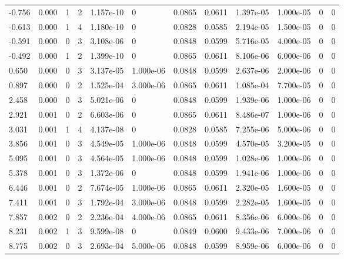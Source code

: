 \documentclass[preview]{standalone}
\begin{document}
{{\begin{tabular}{L{1.2cm}C{1.2cm} C{0.3cm}C{0.5cm} C{1.4cm}C{1.4cm} C{1.4cm}C{1.4cm} C{1.6cm}C{1.6cm} C{1.6cm}C{1.6cm}}
  -0.756  &  0.000  & 1     &  2 &  1.157e-10  & 0  &  0.0865&   0.0611& 1.397e-05 & 1.000e-05   &  0 & 0  \\ 
  -0.613  &  0.000  & 1     &  4 &  1.180e-10  & 0  &  0.0828&   0.0585& 2.194e-05 & 1.500e-05   &  0 & 0  \\ 
  -0.591  &  0.000  & 0     &  3 &  3.108e-06  & 0  &  0.0848&   0.0599& 5.716e-05 & 4.000e-05   &  0 & 0  \\ 
  -0.492  &  0.000  & 1     &  2 &  1.399e-10  & 0  &  0.0865&   0.0611& 8.106e-06 & 6.000e-06   &  0 & 0  \\ 
  0.650  &  0.000  & 0     &  3 &  3.137e-05  & 1.000e-06  &  0.0848&   0.0599& 2.637e-06 & 2.000e-06   &  0 & 0  \\ 
  0.897  &  0.000  & 0     &  2 &  1.525e-04  & 3.000e-06  &  0.0865&   0.0611& 1.085e-04 & 7.700e-05   &  0 & 0  \\ 
  2.458  &  0.000  & 0     &  3 &  5.021e-06  & 0  &  0.0848&   0.0599& 1.939e-06 & 1.000e-06   &  0 & 0  \\ 
  2.921  &  0.001  & 0     &  2 &  6.603e-06  & 0  &  0.0865&   0.0611& 8.486e-07 & 1.000e-06   &  0 & 0  \\ 
  3.031  &  0.001  & 1     &  4 &  4.137e-08  & 0  &  0.0828&   0.0585& 7.255e-06 & 5.000e-06   &  0 & 0  \\ 
  3.856  &  0.001  & 0     &  3 &  4.549e-05  & 1.000e-06  &  0.0848&   0.0599& 4.570e-05 & 3.200e-05   &  0 & 0  \\ 
  5.095  &  0.001  & 0     &  3 &  4.564e-05  & 1.000e-06  &  0.0848&   0.0599& 1.028e-06 & 1.000e-06   &  0 & 0  \\ 
  5.378  &  0.001  & 0     &  3 &  1.372e-06  & 0  &  0.0848&   0.0599& 1.941e-06 & 1.000e-06   &  0 & 0  \\ 
  6.446  &  0.001  & 0     &  2 &  7.674e-05  & 1.000e-06  &  0.0865&   0.0611& 2.320e-05 & 1.600e-05   &  0 & 0  \\ 
  7.411  &  0.001  & 0     &  3 &  1.792e-04  & 3.000e-06  &  0.0848&   0.0599& 2.282e-05 & 1.600e-05   &  0 & 0  \\ 
  7.857  &  0.002  & 0     &  2 &  2.236e-04  & 4.000e-06  &  0.0865&   0.0611& 8.356e-06 & 6.000e-06   &  0 & 0  \\ 
  8.231  &  0.002  & 1     &  3 &  9.599e-08  & 0  &  0.0849&   0.0600& 9.433e-06 & 7.000e-06   &  0 & 0  \\ 
  8.775  &  0.002  & 0     &  3 &  2.693e-04  & 5.000e-06  &  0.0848&   0.0599& 8.959e-06 & 6.000e-06   &  0 & 0  \\ 

\end{tabular}}}
\end{document}
